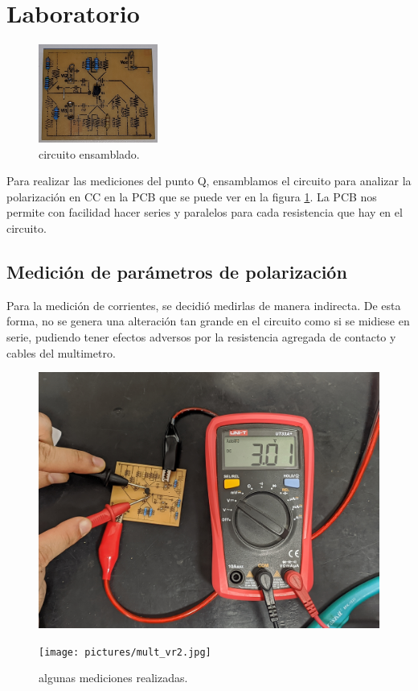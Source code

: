   \section{Laboratorio}
    \begin{figure}
      \vspace{-1cm}
      \centering
      \includegraphics[width=0.35\textwidth]{pictures/pcb.jpg}
      \caption{circuito ensamblado.}
      \label{fig:pcb}
    \end{figure}
    Para realizar las mediciones del punto Q, ensamblamos el circuito para analizar la polarización en CC en la PCB que
    se puede ver en la figura \ref{fig:pcb}. La PCB nos permite con facilidad hacer series y paralelos para cada
    resistencia que hay en el circuito.

    \subsection{Medición de parámetros de polarización}
      Para la medición de corrientes, se decidió medirlas de manera indirecta. De esta forma, no se genera una
      alteración tan grande en el circuito como si se midiese en serie, pudiendo tener efectos adversos por la
      resistencia agregada de contacto y cables del multimetro.
      \begin{figure}[!ht]
        \centering
        \begin{minipage}{0.49\textwidth}
          \centering
          \includegraphics[width=1\textwidth]{pictures/mult_vce.jpg}
        \end{minipage}
        \hfill
        \begin{minipage}{0.49\textwidth}
          \centering
          \texttt{[image: pictures/mult\_vr2.jpg]}
        \end{minipage}
        \caption{algunas mediciones realizadas.}
      \end{figure}

